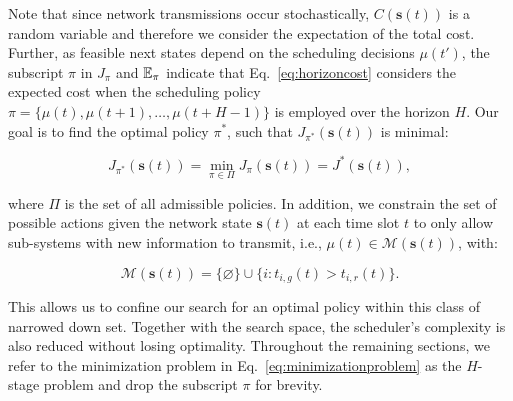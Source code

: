 Note that since network transmissions occur stochastically,
$C(\boldsymbol{s}(t))$ is a random variable and therefore we consider the
expectation of the total cost. Further, as feasible next states depend on the
scheduling decisions $\mu(t')$, the subscript $\pi$ in $J_\pi$ and $\mathbb{E}_\pi$
indicate that Eq.~\eqref{eq:horizoncost} considers the expected cost when the
scheduling policy $\pi = \{ \mu(t), {\mu(t+1)}, \dots, \mu(t+H-1) \}$ is
employed over the horizon $H$. Our goal is to find the optimal policy $\pi^*$,
such that $J_{\pi^*}(\boldsymbol{s}(t))$ is minimal:

\begin{equation}
\label{eq:minimizationproblem}
	J_{\pi^*}(\boldsymbol{s}(t)) = \min_{\pi \in \Pi} J_\pi (\boldsymbol{s}(t)) = J^*(\boldsymbol{s}(t)),
\end{equation}

where $\Pi$ is the set of all admissible policies. In addition, we constrain the
set of possible actions given the network state $\boldsymbol{s}(t)$ at each time
slot $t$ to only allow sub-systems with new information to transmit, i.e.,
$\mu(t) \in \mathcal{M}(\boldsymbol{s}(t))$, with:

\begin{equation}
  \label{eq:admissibleactions}
  \mathcal{M}(\boldsymbol{s}(t)) = \{\varnothing\} \cup \{i : t_{i,g}(t) > t_{i,r}(t) \}.
\end{equation}

This allows us to confine our search for an optimal policy within this class of
narrowed down set. Together with the search space, the scheduler's complexity is
also reduced without losing optimality. Throughout the remaining sections, we
refer to the minimization problem in Eq.~\eqref{eq:minimizationproblem} as the
$H$-stage problem and drop the subscript $\pi$ for brevity.
